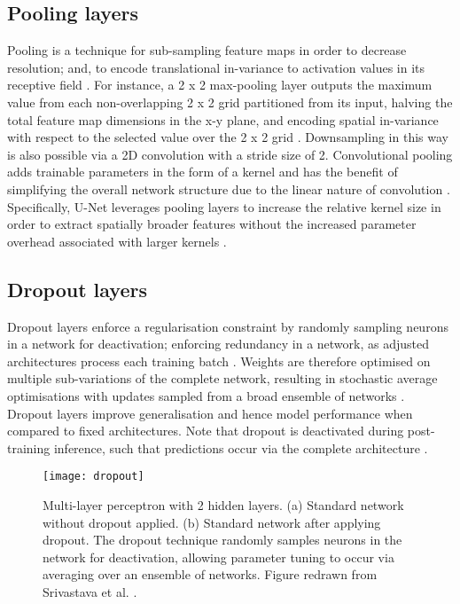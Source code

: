 \subsection{Pooling layers}
Pooling is a technique for sub-sampling feature maps in order to decrease
resolution; and, to encode translational in-variance to activation values in its
receptive field \cite{Lundervold2019}. For instance, a 2 x 2 max-pooling layer
outputs the maximum value from each non-overlapping 2 x 2 grid partitioned from
its input, halving the total feature map dimensions in the x-y plane, and
encoding spatial in-variance with respect to the selected value over the 2 x 2
grid \cite{Lundervold2019}. Downsampling in this way is also possible via a 2D
convolution with a stride size of 2. Convolutional pooling adds trainable
parameters in the form of a kernel and has the benefit of simplifying the
overall network structure due to the linear nature of convolution
\cite{springenberg2014}. Specifically, U-Net leverages pooling layers to
increase the relative kernel size in order to extract spatially broader features
without the increased parameter overhead associated with larger kernels
\cite{Hesamian2019}.

\subsection{Dropout layers}
Dropout layers enforce a regularisation constraint by randomly sampling neurons
in a network for deactivation; enforcing redundancy in a network, as adjusted
architectures process each training batch \cite{Lundervold2019}. Weights are
therefore optimised on multiple sub-variations of the complete network,
resulting in stochastic average optimisations with updates sampled from a broad
ensemble of networks \cite{srivastava2014}. Dropout layers improve
generalisation and hence model performance when compared to fixed architectures.
Note that dropout is deactivated during post-training inference, such that
predictions occur via the complete architecture \cite{Lundervold2019}.

\begin{figure}[h]
	\begin{center}
		\texttt{[image: dropout]}
		\caption{Multi-layer perceptron with 2 hidden layers. (a) Standard network
      without dropout applied. (b) Standard network after applying dropout. The
      dropout technique randomly samples neurons in the network for
      deactivation, allowing parameter tuning to occur via averaging over an
      ensemble of networks. Figure redrawn from Srivastava et al.
      \cite{srivastava2014}.}
		\label{fig:dropout}
	\end{center}
\end{figure}

